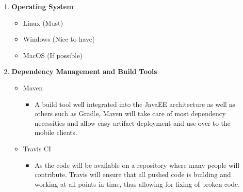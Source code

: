 \documentclass{article}
\begin{document}
\begin{enumerate}
\begin{itemize}
\begin{itemize}
					\end{itemize}
				\end{itemize}
				\item \textbf{Operating System}
				\begin{itemize}
					\item Linux (Must)
					\item Windows (Nice to have)
					\item MacOS (If possible)
				\end{itemize}
				\item \textbf{Dependency Management and Build Tools}
				\begin{itemize}
					\item Maven
					\begin{itemize}
						\item A build tool well integrated into the JavaEE architecture as well as others such as Gradle, Maven will take care of most dependency necessities and allow easy artifact deployment and use over to the mobile clients. 
					\end{itemize}
					\item Travis CI
					\begin{itemize}
						\item As the code will be available on a repository where many people will contribute, Travis will ensure that all pushed code is building and working at all points in time, thus allowing for fixing of broken code.
					\end{itemize}
				\end{itemize}
			\end{enumerate}
		
			
\end{document}
